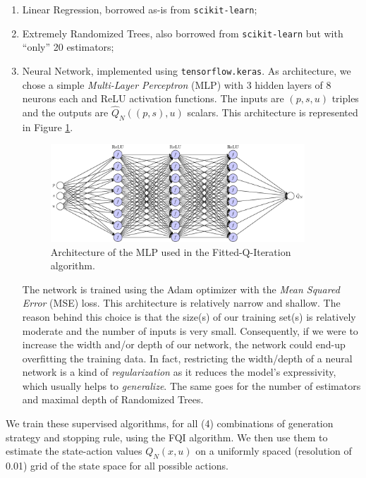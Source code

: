 \documentclass[a4paper, 12pt]{article}
\begin{document}
    \begin{enumerate}
        \item Linear Regression, borrowed as-is from \texttt{scikit-learn};
        \item Extremely Randomized Trees, also borrowed from \texttt{scikit-learn} but with \enquote{only} 20 estimators;
        \item Neural Network, implemented using \texttt{tensorflow.keras}. As architecture, we chose a simple \emph{Multi-Layer Perceptron} (MLP) with 3 hidden layers of 8 neurons each and ReLU activation functions. The inputs are $(p, s, u)$ triples and the outputs are $\hat{Q}_N((p, s), u)$ scalars. This architecture is represented in Figure \ref{fig:mlp.architecture}.
        \begin{figure}[H]
    	    \centering
    	    \includegraphics[width=0.9\textwidth]{resources/tikz/nn.pdf}
    	    \caption{Architecture of the MLP used in the Fitted-Q-Iteration algorithm.}
    	    \label{fig:mlp.architecture}
    	\end{figure}
    	The network is trained using the Adam \cite{kingma2014adam} optimizer with the \emph{Mean Squared Error} (MSE) loss. This architecture is relatively narrow and shallow. The reason behind this choice is that the size(s) of our training set(s) is relatively moderate and the number of inputs is very small. Consequently, if we were to increase the width and/or depth of our network, the network could end-up overfitting the training data. In fact, restricting the width/depth of a neural network is a kind of \emph{regularization} as it reduces the model's expressivity, which usually helps to \emph{generalize}. The same goes for the number of estimators and maximal depth of Randomized Trees.
    \end{enumerate}
    
    We train these supervised algorithms, for all (4) combinations of generation strategy and stopping rule, using the FQI algorithm. We then use them to estimate the state-action values $Q_N(x, u)$ on a uniformly spaced (resolution of \num{0.01}) grid of the state space for all possible actions.
    
\end{document}
